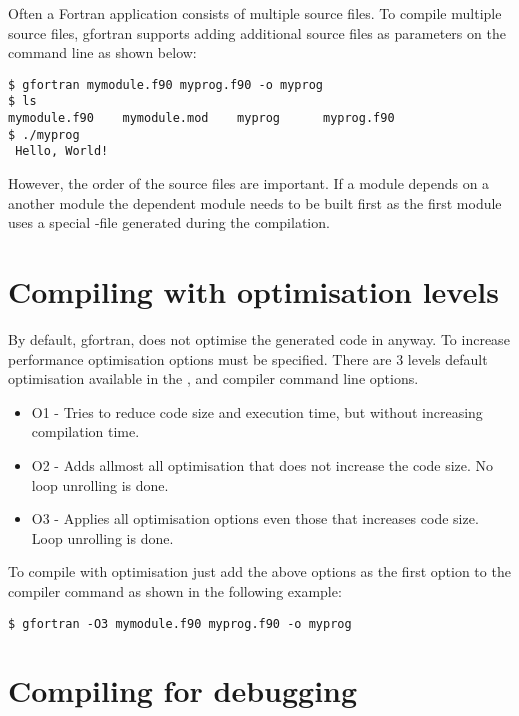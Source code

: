Often a Fortran application consists of multiple source files. To compile multiple source files, gfortran supports adding additional source files as parameters on the command line as shown below:

\begin{lstlisting}
$ gfortran mymodule.f90 myprog.f90 -o myprog
$ ls
mymodule.f90	mymodule.mod	myprog		myprog.f90
$ ./myprog 
 Hello, World!
\end{lstlisting}

However, the order of the source files are important. If a module depends on a another module the dependent module needs to be built first as the first module uses a special -file generated during the compilation. 

\section{Compiling with optimisation levels}

By default, gfortran, does not optimise the generated code in anyway. To increase performance optimisation options must be specified. There are 3 levels default optimisation available in the ,  and  compiler command line options. 

\begin{itemize}
\item O1 - Tries to reduce code size and execution time, but without increasing compilation time.
\item O2 - Adds allmost all optimisation that does not increase the code size. No loop unrolling is done.
\item O3 - Applies all optimisation options even those that increases code size. Loop unrolling is done.
\end{itemize}

To compile with optimisation just add the above options as the first option to the compiler command as shown in the following example:

\begin{lstlisting}
$ gfortran -O3 mymodule.f90 myprog.f90 -o myprog
\end{lstlisting}

\section{Compiling for debugging}

